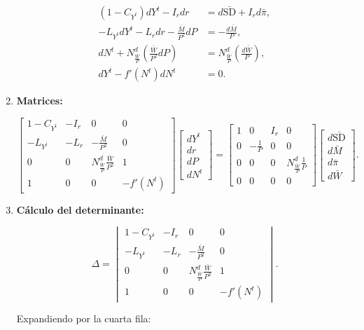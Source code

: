 \documentclass[
  doc,
  floatsintext,
  longtable,
  a4paper,
  nolmodern,
  notxfonts,
  notimes,
  colorlinks=true,linkcolor=blue,citecolor=blue,urlcolor=blue]{apa7}
\begin{document}
\begin{enumerate}
  \[
  \begin{aligned}
  (1 - C_{Y^t}) dY^t - I_r dr &= d\bar{\mathrm{SD}} + I_r d\bar{\pi}, \\
  -L_{Y^t} dY^t - L_r dr - \frac{\bar{M}}{P^2} dP &= -\frac{d\bar{M}}{P}, \\
  dN^t + N^d_{\frac{\bar{W}}{P}} \left( \frac{\bar{W}}{P^2} dP \right) &= N^d_{\frac{\bar{W}}{P}} \left( \frac{d\bar{W}}{P} \right), \\
  dY^t - f'(N^t) dN^t &= 0.
  \end{aligned}
  \]
\item
  \textbf{Matrices:}

  \[
  \begin{bmatrix}
  1 - C_{Y^t} & -I_r & 0 & 0 \\
  -L_{Y^t} & -L_r & -\frac{\bar{M}}{P^2} & 0 \\
  0 & 0 & N^d_{\frac{\bar{W}}{P}} \frac{\bar{W}}{P^2} & 1 \\
  1 & 0 & 0 & -f'(N^t)
  \end{bmatrix}
  \begin{bmatrix}
  dY^t \\
  dr \\
  dP \\
  dN^t
  \end{bmatrix}
  =
  \begin{bmatrix}
  1 & 0 & I_r & 0 \\
  0 & -\frac{1}{P} & 0 & 0 \\
  0 & 0 & 0 & N^d_{\frac{\bar{W}}{P}} \frac{1}{P} \\
  0 & 0 & 0 & 0
  \end{bmatrix}
  \begin{bmatrix}
  d\bar{\mathrm{SD}} \\
  d\bar{M} \\
  d\bar{\pi} \\
  d\bar{W}
  \end{bmatrix}.
  \]
\item
  \textbf{Cálculo del determinante:}

  \[
  \Delta = \begin{vmatrix}
  1 - C_{Y^t} & -I_r & 0 & 0 \\
  -L_{Y^t} & -L_r & -\frac{\bar{M}}{P^2} & 0 \\
  0 & 0 & N^d_{\frac{\bar{W}}{P}} \frac{\bar{W}}{P^2} & 1 \\
  1 & 0 & 0 & -f'(N^t)
  \end{vmatrix}.
  \]

  Expandiendo por la cuarta fila:


\end{enumerate}
\end{document}
